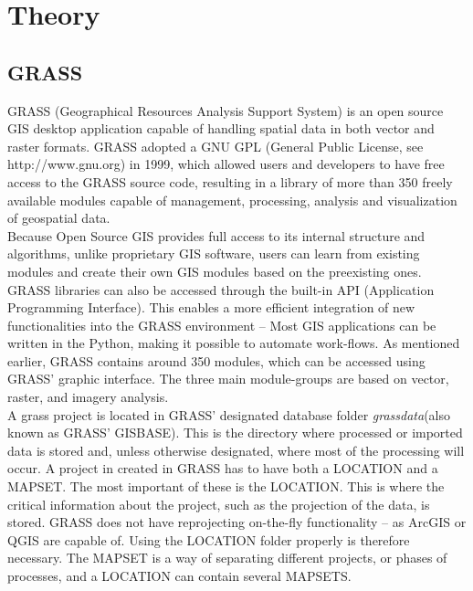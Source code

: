 
\chapter{Theory} %

\label{ch:theory} %


\section{GRASS}

GRASS (Geographical Resources Analysis Support System) is an open source GIS desktop application capable of handling spatial data in both vector and raster formats. 
GRASS adopted a GNU GPL (General Public License, see http://www.gnu.org) in 1999, which allowed users and developers to have free access to the GRASS source code, resulting in a library of more than 350 freely available modules capable of management, processing, analysis and visualization of geospatial data.\\
Because Open Source GIS provides full access to its internal structure and algorithms, unlike proprietary GIS software, users can learn from existing modules and create their own GIS modules based on the preexisting ones. GRASS libraries can also be accessed through the built-in API (Application Programming Interface). This enables a more efficient integration of new functionalities into the GRASS environment – Most GIS applications can be written in the Python, making it possible to automate work-flows.
As mentioned earlier, GRASS contains around 350 modules, which can be accessed using GRASS' graphic interface. The three main module-groups are based on vector, raster, and imagery analysis.\\

A grass project is located in GRASS' designated database folder \textit{grassdata}(also known as GRASS' GISBASE). This is the directory where processed or imported data is stored and, unless otherwise designated, where most of the processing will occur. 
A project in created in GRASS has to have both a \textsc{LOCATION} and a \textsc{MAPSET}.
The most important of these is the \textsc{LOCATION}. This is where the critical information about the project, such as the projection of the data, is stored. 
GRASS does not have reprojecting on-the-fly functionality – as ArcGIS or QGIS are capable of. Using the \textsc{LOCATION} folder properly is therefore necessary. 
The \textsc{MAPSET} is a way of separating different projects, or phases of processes, and a LOCATION can contain several \textsc{MAPSETS}. 

